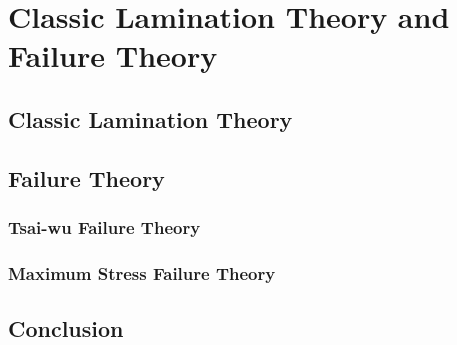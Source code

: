 
\chapter{Classic Lamination Theory and Failure Theory} %

\label{Chapter2} %


\section{Classic Lamination Theory}


\section{Failure Theory}
\subsection{Tsai-wu Failure Theory}
\subsection{Maximum Stress Failure Theory}

\section{Conclusion}
